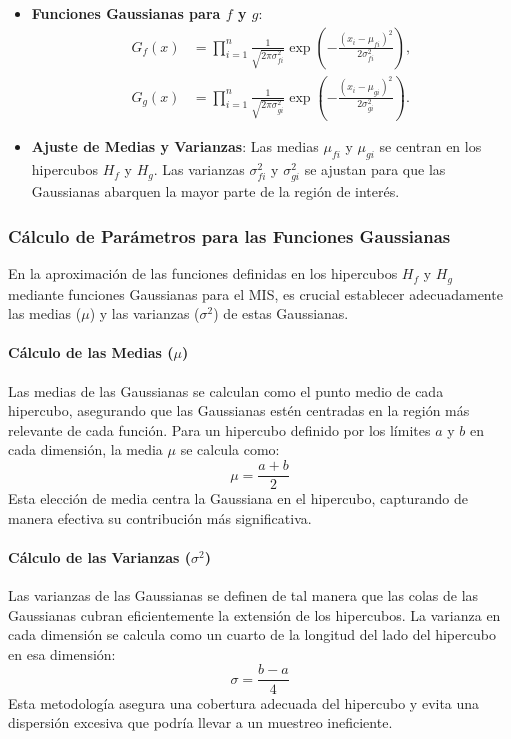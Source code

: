\documentclass{article}
\begin{document}
\begin{itemize}
    \item \textbf{Funciones Gaussianas para \( f \) y \( g \)}:
    \begin{align*}
        G_f(x) &= \prod_{i=1}^{n} \frac{1}{\sqrt{2\pi\sigma_{fi}^2}} \exp\left(-\frac{(x_i - \mu_{fi})^2}{2\sigma_{fi}^2}\right), \\
        G_g(x) &= \prod_{i=1}^{n} \frac{1}{\sqrt{2\pi\sigma_{gi}^2}} \exp\left(-\frac{(x_i - \mu_{gi})^2}{2\sigma_{gi}^2}\right).
    \end{align*}
    \item \textbf{Ajuste de Medias y Varianzas}: Las medias \( \mu_{fi} \) y \( \mu_{gi} \) se centran en los hipercubos \( H_f \) y \( H_g \). Las varianzas \( \sigma_{fi}^2 \) y \( \sigma_{gi}^2 \) se ajustan para que las Gaussianas abarquen la mayor parte de la región de interés.
\end{itemize}

\subsubsection{Cálculo de Parámetros para las Funciones Gaussianas}

En la aproximación de las funciones definidas en los hipercubos \( H_f \) y \( H_g \) mediante funciones Gaussianas para el MIS, es crucial establecer adecuadamente las medias (\( \mu \)) y las varianzas (\( \sigma^2 \)) de estas Gaussianas.

\paragraph{Cálculo de las Medias (\( \mu \))}
Las medias de las Gaussianas se calculan como el punto medio de cada hipercubo, asegurando que las Gaussianas estén centradas en la región más relevante de cada función. Para un hipercubo definido por los límites \( a \) y \( b \) en cada dimensión, la media \( \mu \) se calcula como:
$$
    \mu = \frac{a + b}{2}
$$
Esta elección de media centra la Gaussiana en el hipercubo, capturando de manera efectiva su contribución más significativa.

\paragraph{Cálculo de las Varianzas (\( \sigma^2 \))}
Las varianzas de las Gaussianas se definen de tal manera que las colas de las Gaussianas cubran eficientemente la extensión de los hipercubos. La varianza en cada dimensión se calcula como un cuarto de la longitud del lado del hipercubo en esa dimensión:
$$
    \sigma = \frac{b - a}{4}
$$
Esta metodología asegura una cobertura adecuada del hipercubo y evita una dispersión excesiva que podría llevar a un muestreo ineficiente.
\end{document}
